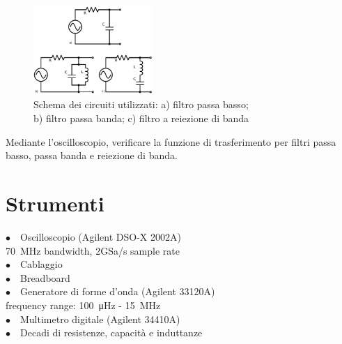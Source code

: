 \begin{figure}
	\centering
    \includegraphics[width=0.40\textwidth]{circuiti2.pdf}
    \caption{Schema dei circuiti utilizzati: a) filtro passa basso;\\ b) filtro passa banda; c) filtro a reiezione di banda}
    \label{fig:circuito}
\end{figure}

Mediante l'oscilloscopio, verificare la funzione di trasferimento per filtri passa basso, passa banda e reiezione di banda.
\section{Strumenti}

$\bullet \quad$Oscilloscopio (Agilent DSO-X 2002A)\\
\phantom{xxxx}\SI{70}{\mega\hertz} bandwidth, 2GSa/s sample rate\\
$\bullet \quad$Cablaggio\\
$\bullet \quad$Breadboard\\
$\bullet \quad$Generatore di forme d'onda (Agilent 33120A)\\
\phantom{xxxx}frequency range: \SI{100}{\micro\hertz} - \SI{15}{\mega\hertz}\\
$\bullet \quad$Multimetro digitale (Agilent 34410A)\\
$\bullet \quad$Decadi di resistenze, capacità e induttanze\\
